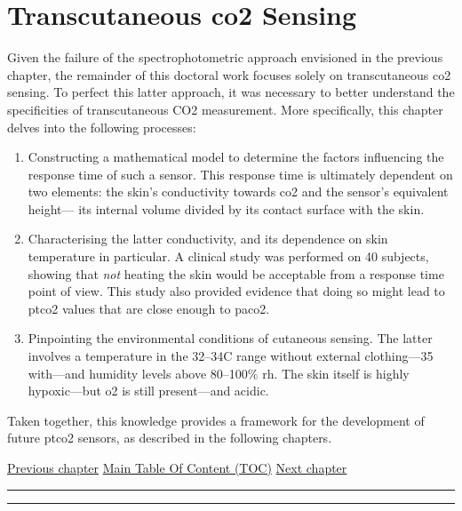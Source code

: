 \chapter{Transcutaneous \texorpdfstring{\gls{co2}}{CO2} Sensing}\label{chap:tcco2}

\begin{tldrbox}
	
	Given the failure of the spectrophotometric approach envisioned in the previous chapter, the remainder of this doctoral work focuses solely on transcutaneous \gls{co2} sensing. To perfect this latter approach, it was necessary to better understand the specificities of transcutaneous CO2 measurement. More specifically, this chapter delves into the following processes:
	\begin{enumerate}
		\item Constructing a mathematical model to determine the factors influencing the response time of such a sensor. This response time is ultimately dependent on two elements: the skin's conductivity towards \gls{co2} and the sensor's equivalent height---\ie{} its internal volume divided by its contact surface with the skin.
		\item Characterising the latter conductivity, and its dependence on skin temperature in particular. A clinical study was performed on 40 subjects, showing that \emph{not} heating the skin would be acceptable from a response time point of view. This study also provided evidence that doing so might lead to \gls{ptco2} values that are close enough to \gls{paco2}.
		\item Pinpointing the environmental conditions of cutaneous sensing. The latter involves a temperature in the 32--34{\degree}C range without external clothing---35{\degree} with---and humidity levels above 80--100\% \gls{rh}. The skin itself is highly hypoxic---but \gls{o2} is still present---and acidic.
	\end{enumerate}
	
	Taken together, this knowledge provides a framework for the development of future \gls{ptco2} sensors, as described in the following chapters.
	
	\tcblower
	
	\hyperref[chap:co2hb]{Previous chapter} \hfill \hyperref[chapter:toc]{Main Table Of Content (TOC)} \hfill \hyperref[chap:choosing_techno]{Next chapter}
	
\end{tldrbox}

\vspace{.3cm}\hrule\vspace{.1cm}\hrule\vspace{.3cm}

